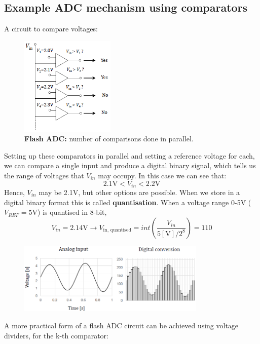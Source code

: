 \documentclass[class=report, crop=false, 12pt,a4paper]{standalone}
\begin{document}
\subsection{Example ADC mechanism using comparators}
A circuit to compare voltages:
\begin{figure}[H]
  \centering
  \includegraphics[width = 0.4\textwidth]{../img/diagram56.png}
  \caption{\textbf{Flash ADC:} number of comparisons done in parallel.}
\end{figure}
Setting up these comparators in parallel and setting a reference voltage for each, we can compare a single input and produce a digital binary signal, which tells us the range of voltages that $V_{in}$ may occupy. In this case we can see that:
\begin{equation}
  2.1 \si{\volt} < V_{in} < 2.2 \si{\volt}
\end{equation}
Hence, $V_{in}$ may be 2.1\si{\volt}, but other options are possible. When we store in a digital binary format this is called \textbf{quantisation}. When a voltage range 0-5\si{\volt} ($V_{REF} = 5\si{\volt}$) is quantised in 8-bit,
\begin{equation}
  V_{in} = 2.14\si{\volt} \rightarrow V_{\textrm{in, quantised}} = int \left(\frac{V_{in}}{5[\si{\volt}]/2^8}\right) = 110
\end{equation}
\begin{figure}[H]
  \centering
  \includegraphics[width = 0.8\textwidth]{../img/diagram57.png}
\end{figure}
A more practical form of a flash ADC circuit can be achieved using voltage dividers, for the k-th comparator:
\end{document}
